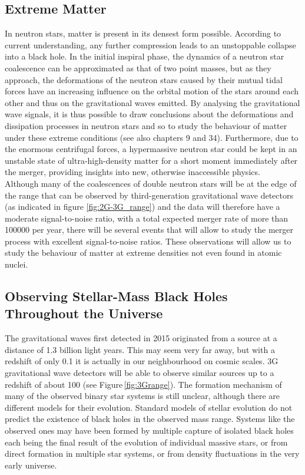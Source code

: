 \documentclass[graybox, nosecnum]{svmult}
\begin{document}
\subsection{Extreme Matter}
In neutron stars, matter is present in its densest form possible. According to current understanding, any further compression leads to an unstoppable collapse into a black hole. In the initial inspiral phase, the dynamics of a neutron star coalescence can be approximated as that of two point masses, but as they approach, the deformations of the neutron stars caused by their mutual tidal forces have an increasing influence on the orbital motion of the stars around each other and thus on the gravitational waves emitted. By analysing the gravitational wave signals, it is thus possible to draw conclusions about the deformations and dissipation processes in neutron stars and so to study the behaviour of matter under these extreme conditions {\color{green} (see also chapters 9 and 34)}. Furthermore, due to the enormous centrifugal forces, a hypermassive neutron star could be kept in an unstable state of ultra-high-density matter for a short moment immediately after the merger, providing insights into new, otherwise inaccessible physics.\\
Although many of the coalescences of double neutron stars will be at the edge of the range that can be observed by third-generation gravitational wave detectors (as indicated in figure \ref{fig:2G-3G_range}) and the data will therefore have a moderate signal-to-noise ratio, with a total expected merger rate of more than 100000 per year, there will be several events that will allow to study the merger process with excellent signal-to-noise ratios. These observations will allow us to study the behaviour of matter at extreme densities not even found in atomic nuclei.


\subsection{Observing Stellar-Mass Black Holes Throughout the Universe}
The gravitational waves first detected in 2015 originated from a source at a distance of 1.3 billion light years. This may seem very far away, but with a redshift of only 0.1 it is actually in our neighbourhood on cosmic scales. 3G gravitational wave detectors will be able to observe similar sources up to a redshift of about 100 (see Figure\,\ref{fig:3Grange}). The formation mechanism of many of the observed binary star systems is still unclear, although there are different models for their evolution. Standard models of stellar evolution do not predict the existence of black holes in the observed mass range. Systems like the observed ones may have been formed by multiple capture of isolated black holes each being the final result of the evolution of individual massive stars, or from direct formation in multiple star systems, or from density fluctuations in the very early universe.
\end{document}
